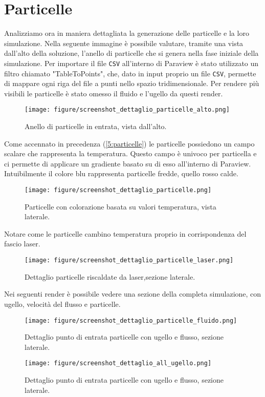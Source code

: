 \section{Particelle}
Analizziamo ora in maniera dettagliata la generazione delle particelle e la loro simulazione.
Nella seguente immagine è possibile valutare, tramite una vista dall'alto della soluzione, l'anello di particelle che si genera nella fase iniziale della simulazione.
Per importare il file \texttt{CSV} all'interno di Paraview è stato utilizzato un filtro chiamato "TableToPoints", che, dato in input proprio un file \texttt{CSV}, permette di mappare 
ogni riga del file a punti nello spazio tridimensionale.
Per rendere più visibili le particelle è stato omesso il fluido e l'ugello da questi render.
\begin{figure}[H]
    \centering
    \texttt{[image: figure/screenshot\_dettaglio\_particelle\_alto.png]}
    \caption{Anello di particelle in entrata, vista dall'alto.}
\end{figure}
Come accennato in precedenza (\ref*{5:particelle}) le particelle possiedono un campo scalare che rappresenta la temperatura. Questo campo è univoco per particella e ci permette di applicare un
gradiente basato su di esso all'interno di Paraview. Intuibilmente il colore blu rappresenta particelle fredde, quello rosso calde.
\begin{figure}[H]
    \centering
    \texttt{[image: figure/screenshot\_dettaglio\_particelle.png]}
    \caption{Particelle con colorazione basata su valori temperatura, vista laterale.}
\end{figure}
Notare come le particelle cambino temperatura proprio in corrispondenza del fascio laser.
\begin{figure}[H]
    \centering
    \texttt{[image: figure/screenshot\_dettaglio\_particelle\_laser.png]}
    \caption{Dettaglio particelle riscaldate da laser,sezione laterale.}
\end{figure}
Nei seguenti render è possibile vedere una sezione della completa simulazione, con ugello, velocità del flusso e particelle.
\begin{figure}[H]
    \centering
    \texttt{[image: figure/screenshot\_dettaglio\_particelle\_fluido.png]}
    \caption{Dettaglio punto di entrata particelle con ugello e flusso, sezione laterale.}
\end{figure}
\begin{figure}[H]
    \centering
    \texttt{[image: figure/screenshot\_dettaglio\_all\_ugello.png]}
    \caption{Dettaglio punto di entrata particelle con ugello e flusso, sezione laterale.}
\end{figure}